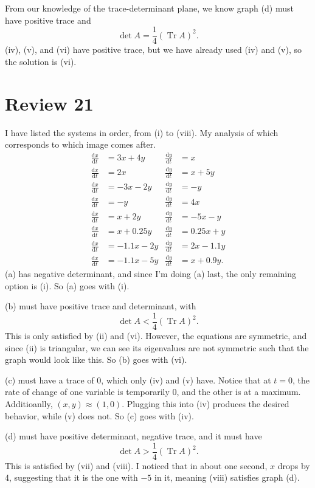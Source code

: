 \documentclass[11pt, letterpaper]{report}
\DeclareMathOperator{\Tr}{Tr}
\begin{document}
From our knowledge of the trace-determinant plane, we know graph (d) must have positive trace and
 \[
	\det A=\frac{1}{4}\left( \Tr A \right) ^2
.\]
(iv), (v), and (vi) have positive trace, but we have already used (iv) and (v), so the solution is (vi).
\section*{Review 21}
I have listed the systems in order, from (i) to (viii). My analysis of which corresponds to which image comes after.
\begin{align*}
	\frac{\mathrm{d}x}{\mathrm{d}t} &=3x+4y&\frac{\mathrm{d}y}{\mathrm{d}t} &=x\\
	\frac{\mathrm{d}x}{\mathrm{d}t} &=2x&\frac{\mathrm{d}y}{\mathrm{d}t} &=x+5y\\
	\frac{\mathrm{d}x}{\mathrm{d}t} &=-3x-2y&\frac{\mathrm{d}y}{\mathrm{d}t} &=-y\\
	\frac{\mathrm{d}x}{\mathrm{d}t} &=-y&\frac{\mathrm{d}y}{\mathrm{d}t} &=4x\\
	\frac{\mathrm{d}x}{\mathrm{d}t} &=x+2y&\frac{\mathrm{d}y}{\mathrm{d}t} &=-5x-y\\
	\frac{\mathrm{d}x}{\mathrm{d}t} &=x+0.25y&\frac{\mathrm{d}y}{\mathrm{d}t} &=0.25x+y\\
	\frac{\mathrm{d}x}{\mathrm{d}t} &=-1.1x-2y&\frac{\mathrm{d}y}{\mathrm{d}t} &=2x-1.1y\\
	\frac{\mathrm{d}x}{\mathrm{d}t} &=-1.1x-5y&\frac{\mathrm{d}y}{\mathrm{d}t} &=x+0.9y
.\end{align*}
(a) has negative determinant, and since I'm doing (a) last, the only remaining option is (i). So (a) goes with (i).

(b) must have positive trace and determinant, with
\[
	\det A<\frac{1}{4}\left( \Tr A \right) ^2
.\]
This is only satisfied by (ii) and (vi). However, the equations are symmetric, and since (ii) is triangular, we can see its eigenvalues are not symmetric such that the graph would look like this. So (b) goes with (vi).

(c) must have a trace of 0, which only (iv) and (v) have. Notice that at $t=0$, the rate of change of one variable is temporarily 0, and the other is at a maximum. Additioanlly, $(x,y)\approx (1,0)$. Plugging this into (iv) produces the desired behavior, while (v) does not. So (c) goes with (iv).

(d) must have positive determinant, negative trace, and it must have
\[
	\det A>\frac{1}{4}\left( \Tr A \right) ^2
.\]
This is satisfied by (vii) and (viii). I noticed that in about one second, $x$ drops by 4, suggesting that it is the one with $-5$ in it, meaning (viii) satisfies graph (d).
\end{document}
